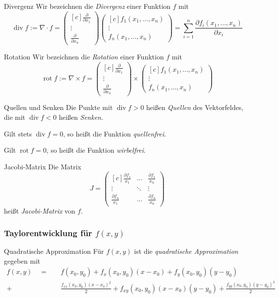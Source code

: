 \documentclass[german]{../spicker}
\newcommand{\vektor}[1]{\begin{pmatrix*}[c] #1 \end{pmatrix*}}
\begin{document}
\begin{defi}{Divergenz}
    Wir bezeichnen die \emph{Divergenz} einer Funktion $f$ mit
    $$
        \operatorname{div} f := \nabla \cdot f = \vektor{\frac{\partial}{\partial x_1} \\ \vdots \\ \frac{\partial}{\partial x_n}} \vektor{f_1(x_1, \ldots, x_n) \\ \vdots \\ f_n(x_1, \ldots, x_n)} = \sum_{i=1}^n \frac{\partial f_i(x_1, \ldots, x_n)}{\partial x_i}
    $$
\end{defi}

\begin{defi}{Rotation}
    Wir bezeichnen die \emph{Rotation} einer Funktion $f$ mit
    $$
        \operatorname{rot} f := \nabla \times f = \vektor{\frac{\partial}{\partial x_1} \\ \vdots \\ \frac{\partial}{\partial x_n}} \times \vektor{f_1(x_1, \ldots, x_n) \\ \vdots \\ f_n(x_1, \ldots, x_n)}
    $$
\end{defi}

\begin{bonus}{Quellen und Senken}
    Die Punkte mit $\operatorname{div} f > 0$ heißen \emph{Quellen} des Vektorfeldes, die mit $\operatorname{div} f < 0$ heißen \emph{Senken}.

    Gilt stets $\operatorname{div} f = 0$, so heißt die Funktion \emph{quellenfrei}.

    Gilt $\operatorname{rot} f = 0$, so heißt die Funktion \emph{wirbelfrei}.
\end{bonus}

\begin{defi}{Jacobi-Matrix}
    Die Matrix
    $$
        J = \vektor{\frac{\partial f_1}{x_1} & \ldots & \frac{\partial f_1}{x_n} \\ \vdots & \ddots & \vdots \\ \frac{\partial f_n}{x_1} & \ldots & \frac{\partial f_n}{x_n}}
    $$
    heißt \emph{Jacobi-Matrix} von $f$.
\end{defi}

\subsubsection{Taylorentwicklung für $f(x, y)$}

\begin{defi}{Quadratische Approximation}
    Für $f(x, y)$ ist die \emph{quadratische Approximation} gegeben mit
    $$
        \begin{aligned}
            f(x, y) \quad = \quad & f(x_0, y_0) + f_x(x_0, y_0) (x-x_0) + f_y(x_0, y_0) (y-y_0)                                                    \\
            + \quad               & \frac{f_{xx}(x_0, y_0) (x-x_0)^2}{2} + f_{xy}(x_0, y_0) (x-x_0) (y-y_0) + \frac{f_{yy}(x_0, y_0) (y-y_0)^2}{2}
        \end{aligned}
    $$
\end{defi}
\end{document}
